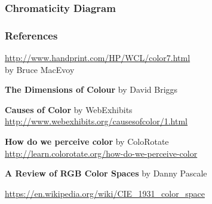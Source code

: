 \documentclass[12pt]{beamer}\usepackage[]{graphicx}\usepackage[]{color}
\begin{document}

\begin{frame}
\frametitle{Chromaticity Diagram}
\begin{center}
\end{center}
\end{frame}


\begin{frame}
\frametitle{References}

\bbi
  \item \url{http://www.handprint.com/HP/WCL/color7.html} \\
  by Bruce MacEvoy
  \item \textbf{The Dimensions of Colour} by David Briggs
  \item \textbf{Causes of Color} by WebExhibits \\
  {\scriptsize \url{http://www.webexhibits.org/causesofcolor/1.html}}
  \item \textbf{How do we perceive color} by ColoRotate \\
  {\tiny \url{http://learn.colorotate.org/how-do-we-perceive-color}}
  \item \textbf{A Review of RGB Color Spaces} by Danny Pascale
  \item {\scriptsize \url{https://en.wikipedia.org/wiki/CIE_1931_color_space}}
\ei

\end{frame}

\end{document}
